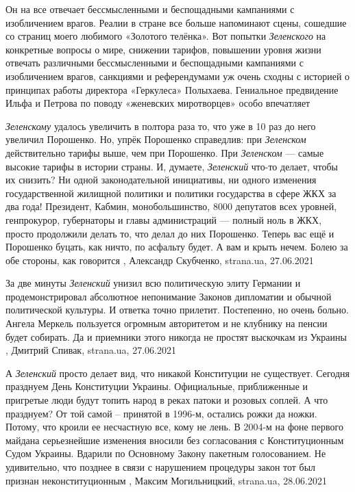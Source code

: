 Он на все отвечает бессмысленными и беспощадными кампаниями с изобличением
врагов.  Реалии в стране все больше напоминают сцены, сошедшие со страниц моего
любимого «Золотого телёнка». Вот попытки \emph{Зеленского} на конкретные вопросы о
мире, снижении тарифов, повышении уровня жизни отвечать различными
бессмысленными и беспощадными кампаниями с изобличением врагов, санкциями и
референдумами уж очень сходны с историей о принципах работы директора
«Геркулеса» Полыхаева.  Гениальное предвидение Ильфа и Петрова по поводу
«женевских миротворцев» особо впечатляет


\emph{Зеленскому} удалось увеличить в полтора раза то, что уже в 10 раз до него
увеличил Порошенко. Но, упрёк Порошенко справедлив: при \emph{Зеленском} действительно
тарифы выше, чем при Порошенко. При \emph{Зеленском} — самые высокие тарифы в истории
страны.  И, думаете, \emph{Зеленский} что-то делает, чтобы их снизить? Ни одной
законодательной инициативы, ни одного изменения государственной жилищной
политики и политики государства в сфере ЖКХ за два года! Президент, Кабмин,
монобольшинство, 8000 депутатов всех уровней, генпрокурор, губернаторы и главы
администраций — полный ноль в ЖКХ, просто продолжили делать то, что делал до
них Порошенко. Теперь вас ещё и Порошенко буцать, как ничто, по асфальту будет.
А вам и крыть нечем. Болею за обе стороны, как говорится
, 
Александр Скубченко, strana.ua, 27.06.2021

За две минуты \emph{Зеленский} унизил всю политическую элиту Германии и
продемонстрировал абсолютное непонимание Законов дипломатии и обычной
политической культуры.  И ответка точно прилетит. Постепенно, но очень больно.
Ангела Меркель пользуется огромным авторитетом и не клубнику на пенсии будет
собирать.  Да и приемники этого никогда не простят выскочкам из Украины
, 
Дмитрий Спивак, strana.ua, 27.06.2021

А \emph{Зеленский} просто делает вид, что никакой Конституции не существует.  Сегодня
празднуем День Конституции Украины. Официальные, приближенные и пригретые люди
будут топить народ в реках патоки и розовых соплей. А что празднуем? От той
самой – принятой в 1996-м, остались рожки да ножки. Потому, что кроили ее
несчастную все, кому не лень.  В 2004-м на фоне первого майдана серьезнейшие
изменения вносили без согласования с Конституционным Судом Украины. Вдарили по
Основному Закону пакетным голосованием. Не удивительно, что позднее в связи с
нарушением процедуры закон тот был признан неконституционным
  , 
	Максим Могильницкий, strana.ua, 28.06.2021

